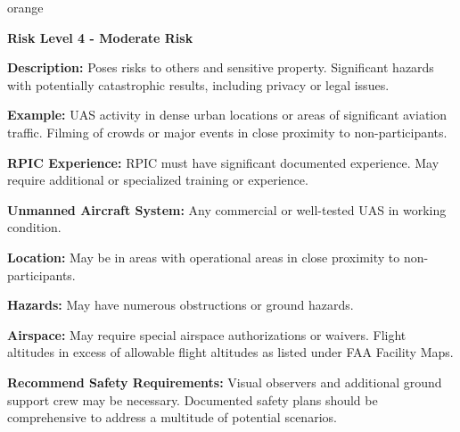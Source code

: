 \documentclass[
]{book}
\newenvironment{content}{\hrulefill}{}{}
\newenvironment{titleB}{}{}
\begin{document}
\begin{content-box}{orange}

\begin{titleB}

\textbf{Risk Level 4 - Moderate Risk}

\end{titleB}

\begin{content}

\textbf{Description:} Poses risks to others and sensitive property. Significant hazards with potentially catastrophic results, including privacy or legal issues.

\textbf{Example:} UAS activity in dense urban locations or areas of significant aviation traffic. Filming of crowds or major events in close proximity to non-participants.

\textbf{RPIC Experience:} RPIC must have significant documented experience. May require additional or specialized training or experience.

\textbf{Unmanned Aircraft System:} Any commercial or well-tested UAS in working condition.

\textbf{Location:} May be in areas with operational areas in close proximity to non-participants.

\textbf{Hazards:} May have numerous obstructions or ground hazards.

\textbf{Airspace:} May require special airspace authorizations or waivers. Flight altitudes in excess of allowable flight altitudes as listed under FAA Facility Maps.

\textbf{Recommend Safety Requirements:} Visual observers and additional ground support crew may be necessary. Documented safety plans should be comprehensive to address a multitude of potential scenarios.

\end{content}

\end{content-box}
\end{document}
